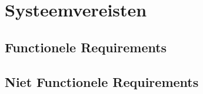 \chapter{Systeemvereisten}

\section{Functionele Requirements}








\section{Niet Functionele Requirements}
